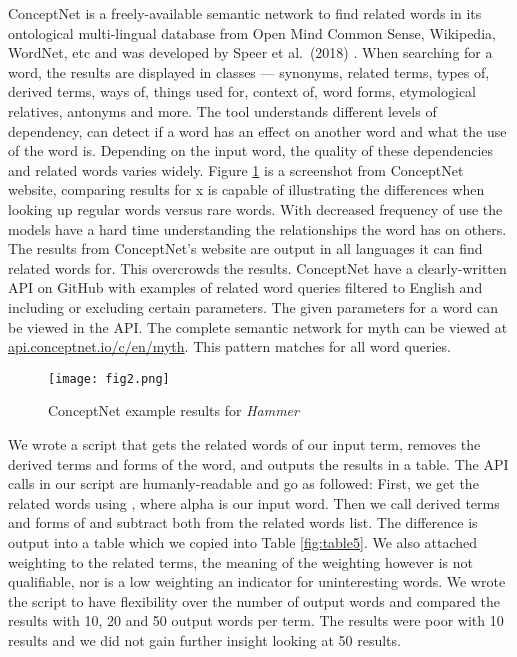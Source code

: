 \documentclass[12pt, usenames, dvipsnames]{report}
\begin{document}
\begin{flushleft}
ConceptNet is a freely-available semantic network to find related words in its ontological multi-lingual database from Open Mind Common Sense, Wikipedia, WordNet, etc and was developed by Speer et al.\ (2018) \cite{speer2018}.
When searching for a word, the results are displayed in classes --- synonyms, related terms, types of, derived terms, ways of, things used for, context of, word forms, etymological relatives, antonyms and more.
The tool understands different levels of dependency, can detect if a word has an effect on another word and what the use of the word is.
Depending on the input word, the quality of these dependencies and related words varies widely.
Figure \ref{fig:figure2} is a screenshot from ConceptNet website, comparing results for x is capable of illustrating the differences when looking up regular words versus rare words.
With decreased frequency of use the models have a hard time understanding the relationships the word has on others.
The results from ConceptNet’s website are output in all languages it can find related words for.
This overcrowds the results.
ConceptNet have a clearly-written API on GitHub with examples of related word queries filtered to English and including or excluding certain parameters.
The given parameters for a word can be viewed in the API.
The complete semantic network for myth can be viewed at \url{api.conceptnet.io/c/en/myth}.
This pattern matches for all word queries.

\vspace*{0.2em}
\begin{figure}[!htbp]
  \hspace*{11em}
  \texttt{[image: fig2.png]}
  \caption{ConceptNet example results for \emph{Hammer}}
  \label{fig:figure2}
\end{figure}
\vspace*{0.2em}

We wrote a script that gets the related words of our input term, removes the derived terms and forms of the word, and outputs the results in a table.
The API calls in our script are humanly-readable and go as followed:
First, we get the related words using , where alpha is our input word.
Then we call derived terms  and forms of  and subtract both from the related words list.
The difference is output into a table which we copied into Table \ref{fig:table5}.
We also attached weighting to the related terms, the meaning of the weighting however is not qualifiable, nor is a low weighting an indicator for uninteresting words.
We wrote the script to have flexibility over the number of output words and compared the results with 10, 20 and 50 output words per term.
The results were poor with 10 results and we did not gain further insight looking at 50 results.


\end{flushleft}
\end{document}
